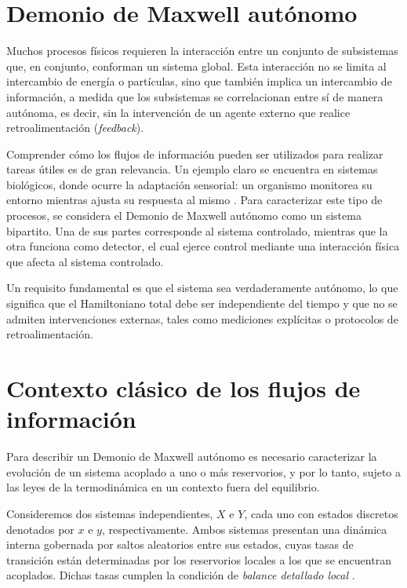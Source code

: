\label{sec4:Demon}

\section{Demonio de Maxwell autónomo}

Muchos procesos físicos requieren la interacción entre un conjunto de subsistemas que, en conjunto, conforman un sistema global. Esta interacción no se limita al intercambio de energía o partículas, sino que también implica un intercambio de información, a medida que los subsistemas se correlacionan entre sí de manera autónoma, es decir, sin la intervención de un agente externo que realice retroalimentación (\textit{feedback}). 

Comprender cómo los flujos de información pueden ser utilizados para realizar tareas útiles es de gran relevancia. Un ejemplo claro se encuentra en sistemas biológicos, donde ocurre la adaptación sensorial: un organismo monitorea su entorno mientras ajusta su respuesta al mismo \cite{lan2012energy}. Para caracterizar este tipo de procesos, se considera el Demonio de Maxwell autónomo como un sistema bipartito. Una de sus partes corresponde al sistema controlado, mientras que la otra funciona como detector, el cual ejerce control mediante una interacción física que afecta al sistema controlado. 

Un requisito fundamental es que el sistema sea verdaderamente autónomo, lo que significa que el Hamiltoniano total debe ser independiente del tiempo y que no se admiten intervenciones externas, tales como mediciones explícitas o protocolos de retroalimentación.

\label{sec4:autonomo}
\section{Contexto clásico de los flujos de información}

Para describir un Demonio de Maxwell autónomo es necesario caracterizar la evolución de un sistema acoplado a uno o más reservorios, y por lo tanto, sujeto a las leyes de la termodinámica en un contexto fuera del equilibrio. 

Consideremos dos sistemas independientes, \( X \) e \( Y \), cada uno con estados discretos denotados por \( x \) e \( y \), respectivamente. Ambos sistemas presentan una dinámica interna gobernada por saltos aleatorios entre sus estados, cuyas tasas de transición están determinadas por los reservorios locales a los que se encuentran acoplados. Dichas tasas cumplen la condición de \textit{balance detallado local} \cite{van2015ensemble}. 

